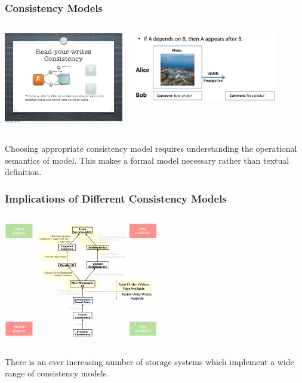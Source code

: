 \documentclass{beamer}
\begin{document}
\begin{frame}
\frametitle{Consistency Models}

\begin{columns}
	
	\includegraphics[height=4cm]{rywmodel.png}
	
	\includegraphics[height=3cm]{causalmodel.png}
\end{columns}
Choosing appropriate consistency model requires understanding the operational  semantics of model. This makes a formal model necessary rather than textual definition.

\end{frame}

\begin{frame}
\frametitle{Implications of Different Consistency Models}
\begin{columns}
	
	
	\includegraphics[height=5cm]{implications.png}
\end{columns}
There is an ever increasing number of storage systems which implement a wide range of consistency models. 

\end{frame}
\end{document}
